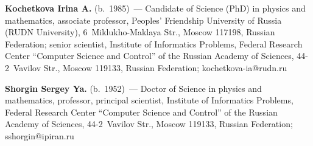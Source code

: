   \vspace*{3pt}
  
  \noindent
  \textbf{Kochetkova Irina A.} (b.\ 1985)~--- Candidate of Science (PhD) in physics 
and mathematics, associate professor, Peoples' Friendship University of Russia 
(RUDN University), 6~Miklukho-Maklaya Str., Moscow 117198, Russian 
Federation; senior scientist, Institute of Informatics Problems, Federal Research 
Center ``Computer Science and Control'' of the Russian Academy of Sciences, 
44-2~Vavilov Str., Moscow 119133, Russian Federation; \mbox{kochetkova-ia@rudn.ru}
  
  \vspace*{3pt}
  
  \noindent
  \textbf{Shorgin Sergey Ya.} (b.\ 1952)~--- Doctor of Science in physics and 
mathematics, professor, principal scientist, Institute of Informatics Problems, Federal 
Research Center ``Computer Science and Control'' of the Russian Academy of 
Sciences, 44-2~Vavilov Str., Moscow 119133, Russian Federation; 
\mbox{sshorgin@ipiran.ru}
  

\label{end\stat}

\renewcommand{\bibname}{\protect\rm Литература}    